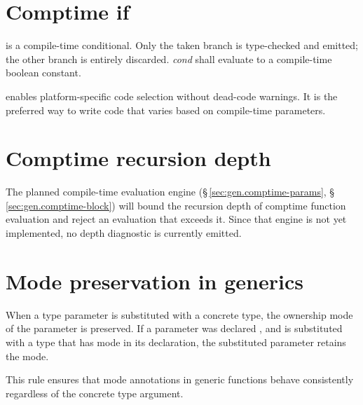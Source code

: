\section{Comptime if}
\label{sec:gen.comptime-if}

\pnum
{} is a compile-time
conditional.  Only the taken branch is type-checked and emitted; the other
branch is entirely discarded.  \textit{cond} shall evaluate to a
compile-time boolean constant.

\begin{note}
   enables platform-specific code selection without
  dead-code warnings.  It is the preferred way to write code that
  varies based on compile-time parameters.
\end{note}

\section{Comptime recursion depth}
\label{sec:gen.recursion-depth}

\pnum
The planned compile-time evaluation engine (\S\,\ref{sec:gen.comptime-params},
\S\,\ref{sec:gen.comptime-block}) will bound the recursion depth of comptime
function evaluation  and reject an
evaluation that exceeds it.  Since that engine is not yet implemented, no depth
diagnostic is currently emitted.

\section{Mode preservation in generics}
\label{sec:gen.mode-preserve}

\pnum
When a type parameter  is substituted with a concrete type, the
ownership mode of the parameter is preserved.  If a parameter was declared
, and  is substituted with a type that has mode
 in its declaration, the substituted parameter retains the
 mode.

\begin{note}
  This rule ensures that mode annotations in generic functions behave
  consistently regardless of the concrete type argument.
\end{note}
